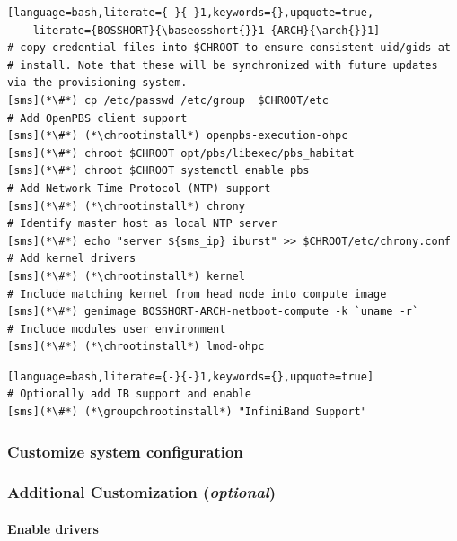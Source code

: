 \documentclass[letterpaper]{article}
\newcommand{\baseosshort}{rocky10}
\newcommand{\arch}{x86\_64}
\newcommand{\chrootinstall}{dnf -y --installroot=\$CHROOT install}
\newcommand{\groupchrootinstall}{dnf -y --installroot=\$CHROOT groupinstall}
\begin{document}
\begin{lstlisting}[language=bash,literate={-}{-}1,keywords={},upquote=true,
    literate={BOSSHORT}{\baseosshort{}}1 {ARCH}{\arch{}}1]
# copy credential files into $CHROOT to ensure consistent uid/gids at
# install. Note that these will be synchronized with future updates via the provisioning system.
[sms](*\#*) cp /etc/passwd /etc/group  $CHROOT/etc
# Add OpenPBS client support
[sms](*\#*) (*\chrootinstall*) openpbs-execution-ohpc
[sms](*\#*) chroot $CHROOT opt/pbs/libexec/pbs_habitat
[sms](*\#*) chroot $CHROOT systemctl enable pbs
# Add Network Time Protocol (NTP) support
[sms](*\#*) (*\chrootinstall*) chrony
# Identify master host as local NTP server
[sms](*\#*) echo "server ${sms_ip} iburst" >> $CHROOT/etc/chrony.conf
# Add kernel drivers
[sms](*\#*) (*\chrootinstall*) kernel
# Include matching kernel from head node into compute image
[sms](*\#*) genimage BOSSHORT-ARCH-netboot-compute -k `uname -r`
# Include modules user environment
[sms](*\#*) (*\chrootinstall*) lmod-ohpc
\end{lstlisting}

\begin{lstlisting}[language=bash,literate={-}{-}1,keywords={},upquote=true]
# Optionally add IB support and enable
[sms](*\#*) (*\groupchrootinstall*) "InfiniBand Support"
\end{lstlisting}

\subsubsection{Customize system configuration} \label{sec:master_customization}



\subsubsection{Additional Customization ({\em optional})} \label{sec:addl_customizations}


\paragraph{Enable \InfiniBand{} drivers}

\end{document}
